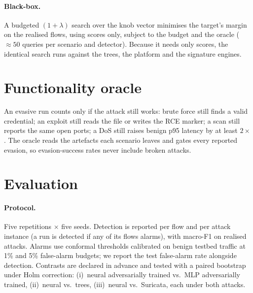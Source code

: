 \documentclass[letterpaper,twocolumn,10pt]{article}
\begin{document}
\paragraph{Black-box.} A budgeted $(1{+}\lambda)$ search over the knob vector
minimises the target's margin on the realised flows, using scores only, subject
to the budget and the oracle ($\approx 50$ queries per scenario and detector).
Because it needs only scores, the identical search runs against the trees, the
platform and the signature engines.

\section{Functionality oracle}\label{sec:oracle}
An evasive run counts only if the attack still works: brute force still finds a
valid credential; an exploit still reads the file or writes the RCE marker; a scan
still reports the same open ports; a DoS still raises benign p95 latency by at
least $2\times$. The oracle reads the artefacts each scenario leaves and gates
every reported evasion, so evasion-success rates never include broken attacks.

\section{Evaluation}\label{sec:results}
\paragraph{Protocol.} Five repetitions $\times$ five seeds. Detection is reported
per flow and per attack instance (a run is detected if any of its flows alarms),
with macro-F1 on realised attacks. Alarms use conformal thresholds calibrated on
benign testbed traffic at 1\% and 5\% false-alarm budgets; we report the test
false-alarm rate alongside detection. Contrasts are declared in advance and
tested with a paired bootstrap under Holm correction:
(i)~neural adversarially trained vs.\ MLP adversarially trained,
(ii)~neural vs.\ trees, (iii)~neural vs.\ Suricata, each under both attacks.
\end{document}
